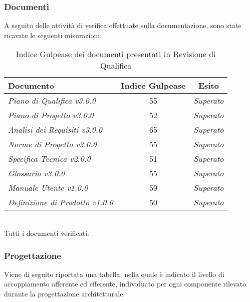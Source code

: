 \subsubsection{Documenti}
\label{docRQ}
A seguito delle attività di verifica effettuate sulla documentazione, sono state ricavate le seguenti misurazioni:
\begin{table}[!h]
\begin{center}
		\begin{tabular}{|p{5cm}|c|c|}
			\hline
			\textbf{Documento} &
			\textbf{Indice Gulpease} &
			\textbf{Esito}\\ \hline
			\textit{Piano di Qualifica v3.0.0} & 55 &  \textit{\color{green}Superato} \\ 
			\textit{Piano di Progetto v3.0.0} & 52 & \textit{\color{green}Superato} \\ 
			\textit{Analisi dei Requisiti v3.0.0} & 65 & \textit{\color{green}Superato} \\ 
			\textit{Norme di Progetto v3.0.0} & 55 & \textit{\color{green}Superato} \\ 
			\textit{Specifica Tecnica v2.0.0} & 51 & \textit{\color{green}Superato} \\ 
			\textit{Glossario v3.0.0} & 55 & \textit{\color{green}Superato} \\ 
			\textit{Manuale Utente v1.0.0}& 59 &\textit{\color{green}Superato}\\
			\textit{Definizione di Prodotto v1.0.0}& 50 &\textit{\color{green}Superato}\\
			\hline
		\end{tabular}
		\caption{Indice Gulpease dei documenti presentati in Revisione di Qualifica}
\end{center}
\end{table}
\\Tutti i documenti verificati.

\subsubsection{Progettazione}
Viene di seguito riportata una tabella, nella quale è indicato il livello di accoppiamento afferente ed efferente, individuato per ogni componente rilevato durante la progettazione architetturale.\\

